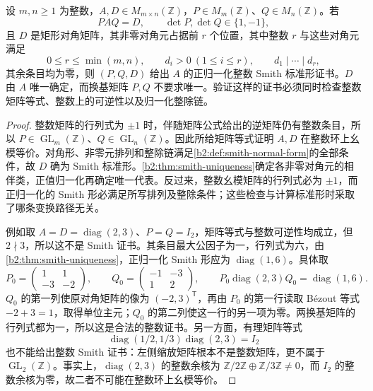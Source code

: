 \begin{proposition}\label{b2:prop:A-smith-certificate-validation}
	设 \(m,n\ge1\) 为整数，\(A,D\in M_{m\times n}(\mathbb Z)\)，\(P\in M_m(\mathbb Z)\)、\(Q\in M_n(\mathbb Z)\)。若
	\[
		PAQ=D,\qquad \det P,\det Q\in\{1,-1\},
	\]
	且 \(D\) 是矩形对角矩阵，其非零对角元占据前 \(r\) 个位置，其中整数 \(r\) 与这些对角元满足
	\[
		0\le r\le\min(m,n),\qquad d_i>0\ (1\le i\le r),\qquad d_1\mid\cdots\mid d_r,
	\]
	其余条目均为零，则 \((P,Q,D)\) 给出 \(A\) 的正归一化整数 Smith 标准形证书。\(D\) 由 \(A\) 唯一确定，而换基矩阵 \(P,Q\) 不要求唯一。验证这样的证书必须同时检查整数矩阵等式、整数上的可逆性以及归一化整除链。
\end{proposition}
\begin{proof}
	整数矩阵的行列式为 \(\pm1\) 时，伴随矩阵公式给出的逆矩阵仍有整数条目，所以 \(P\in\operatorname{GL}_m(\mathbb Z)\)、\(Q\in\operatorname{GL}_n(\mathbb Z)\)。因此所给矩阵等式证明 \(A,D\) 在整数环上幺模等价。对角形、非零元排列和整除链满足\cref{b2:def:smith-normal-form}的全部条件，故 \(D\) 确为 Smith 标准形。\cref{b2:thm:smith-uniqueness}确定各非零对角元的相伴类，正值归一化再确定唯一代表。反过来，整数幺模矩阵的行列式必为 \(\pm1\)，而正归一化的 Smith 形必满足所写排列及整除条件；这些检查与计算标准形时采取了哪条变换路径无关。

	例如取 \(A=D=\operatorname{diag}(2,3)\)、\(P=Q=I_2\)，矩阵等式与整数可逆性均成立，但 \(2\nmid3\)，所以这不是 Smith 证书。其条目最大公因子为一，行列式为六，由\cref{b2:thm:smith-uniqueness}，正归一化 Smith 形应为 \(\operatorname{diag}(1,6)\)。具体取
	\[
		P_0=\begin{pmatrix}1&1\\-3&-2\end{pmatrix},\qquad
		Q_0=\begin{pmatrix}-1&-3\\1&2\end{pmatrix},\qquad
		P_0\operatorname{diag}(2,3)Q_0=\operatorname{diag}(1,6).
	\]
	\(Q_0\) 的第一列使原对角矩阵的像为 \((-2,3)^{\mathsf T}\)，再由 \(P_0\) 的第一行读取 Bézout 等式 \(-2+3=1\)，取得单位主元；\(Q_0\) 的第二列使这一行的另一项为零。两换基矩阵的行列式都为一，所以这是合法的整数证书。另一方面，有理矩阵等式
	\[
		\operatorname{diag}(1/2,1/3)\operatorname{diag}(2,3)=I_2
	\]
	也不能给出整数 Smith 证书：左侧缩放矩阵根本不是整数矩阵，更不属于 \(\operatorname{GL}_2(\mathbb Z)\)。事实上，\(\operatorname{diag}(2,3)\) 的整数余核为 \(\mathbb Z/2\mathbb Z\oplus\mathbb Z/3\mathbb Z\ne0\)，而 \(I_2\) 的整数余核为零，故二者不可能在整数环上幺模等价。
\end{proof}
